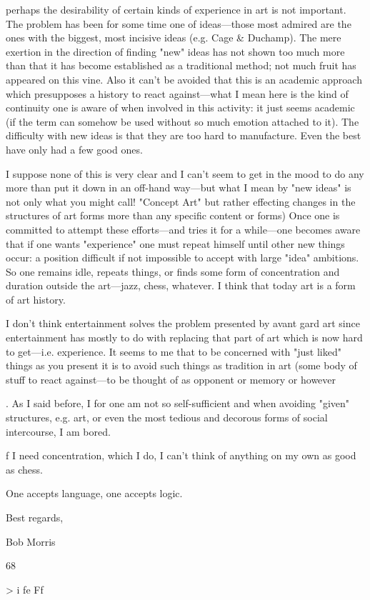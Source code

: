 \documentclass[10pt,twoside]{memoir}
\begin{document}
\begin{enumerate}
{{{{{{{{{{{{{{perhaps the desirability of certain kinds of experience in art is not 
important. The problem has been for some time one of ideas---those most 
admired are the ones with the biggest, most incisive ideas (e.g. Cage & 
Duchamp). The mere exertion in the direction of finding "new" ideas has 
not shown too much more than that it has become established as a 
traditional method; not much fruit has appeared on this vine. Also it can't be 
avoided that this is an academic approach which presupposes a history to 
react against---what I mean here is the kind of continuity one is aware of 
when involved in this activity: it just seems academic (if the term can 
somehow be used without so much emotion attached to it). The difficulty 
with new ideas is that they are too hard to manufacture. Even the best have 
only had a few good ones. {I suppose none of this is very clear and I can't 
seem to get in the mood to do any more than put it down in an off-hand 
way---but what I mean by "new ideas" is not only what you might call! 
"Concept Art" but rather effecting changes in the structures of art forms 
more than any specific content or forms) Once one is committed to attempt 
these efforts---and tries it for a while---one becomes aware that if one wants 
"experience" one must repeat himself until other new things occur: a 
position difficult if not impossible to accept with large "idea" ambitions. So 
one remains idle, repeats things, or finds some form of concentration and 
duration outside the art---jazz, chess, whatever. I think that today art is a 
form of art history. 

I don't think entertainment solves the problem presented by avant gard art 
since entertainment has mostly to do with replacing that part of art which is 
now hard to get---i.e. experience. It seems to me that to be concerned with 
"just liked" things as you present it is to avoid such things as tradition in art 
(some body of stuff to react against---to be thought of as opponent or 
memory or however}. As I said before, I for one am not so self-sufficient and 
when avoiding "given" structures, e.g. art, or even the most tedious and 
decorous forms of social intercourse, I am bored. {f I need concentration, 
which I do, I can't think of anything on my own as good as chess. 

One accepts language, one accepts logic. 

Best regards, 

Bob Morris 


68 


> 
i 
fe 
Ff 


}}}}}}}}}}}}}}}
\end{enumerate}
\end{document}
